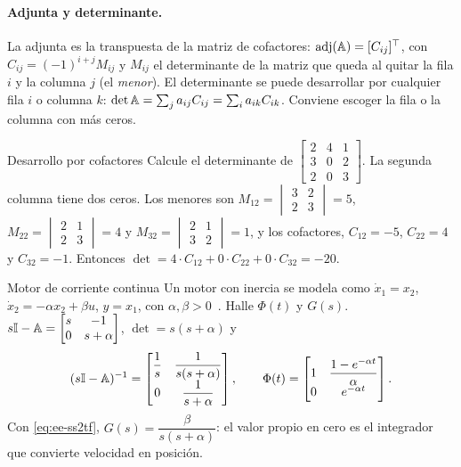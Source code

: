 \paragraph{Adjunta y determinante.} La adjunta es la transpuesta de la matriz de cofactores: $\operatorname{adj}(\mathbb{A})=[C_{ij}]^\top$, con $C_{ij}=(-1)^{i+j}M_{ij}$ y $M_{ij}$ el determinante de la matriz que queda al quitar la fila $i$ y la columna $j$ (el \emph{menor}). El determinante se puede desarrollar por cualquier fila $i$ o columna $k$: $\det\mathbb{A}=\sum_ja_{ij}C_{ij}=\sum_ia_{ik}C_{ik}$. Conviene escoger la fila o la columna con más ceros.

\begin{ejemplo}[label=ej:ee-det]{Desarrollo por cofactores}
Calcule el determinante de $\begin{bmatrix}2&4&1\\3&0&2\\2&0&3\end{bmatrix}$.
\solucion La segunda columna tiene dos ceros. Los menores son $M_{12}=\begin{vmatrix}3&2\\2&3\end{vmatrix}=5$, $M_{22}=\begin{vmatrix}2&1\\2&3\end{vmatrix}=4$ y $M_{32}=\begin{vmatrix}2&1\\3&2\end{vmatrix}=1$, y los cofactores, $C_{12}=-5$, $C_{22}=4$ y $C_{32}=-1$. Entonces $\det=4\cdot C_{12}+0\cdot C_{22}+0\cdot C_{32}=-20$.
\end{ejemplo}

\begin{ejemplo}[label=ej:ee-motor]{Motor de corriente continua}
Un motor con inercia se modela como $\dot x_1=x_2$, $\dot x_2=-\alpha x_2+\beta u$, $y=x_1$, con $\alpha,\beta>0$~\citep{Fri86}. Halle $\Phi(t)$ y $G(s)$.
\solucion $s\mathbb{I}-\mathbb{A}=\begin{bmatrix}s&-1\\0&s+\alpha\end{bmatrix}$, $\det=s(s+\alpha)$ y
\[
  (s\mathbb{I}-\mathbb{A})^{-1}=\begin{bmatrix}\dfrac1s&\dfrac{1}{s(s+\alpha)}\\[2mm]0&\dfrac{1}{s+\alpha}\end{bmatrix},
  \qquad
  \Phi(t)=\begin{bmatrix}1&\dfrac{1-e^{-\alpha t}}{\alpha}\\0&e^{-\alpha t}\end{bmatrix}.
\]
Con \eqref{eq:ee-ss2tf}, $G(s)=\dfrac{\beta}{s(s+\alpha)}$: el valor propio en cero es el integrador que convierte velocidad en posición.
\end{ejemplo}

